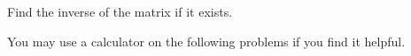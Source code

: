 \documentclass[12pt]{exam}
\begin{document}
\begin{questions}

\question
Find the inverse of the matrix if it exists.
\smallskip
{}

\end{questions}

\bigskip
\bigskip
\clearpage
You may use a calculator on the following problems if you find it helpful.
\end{document}
